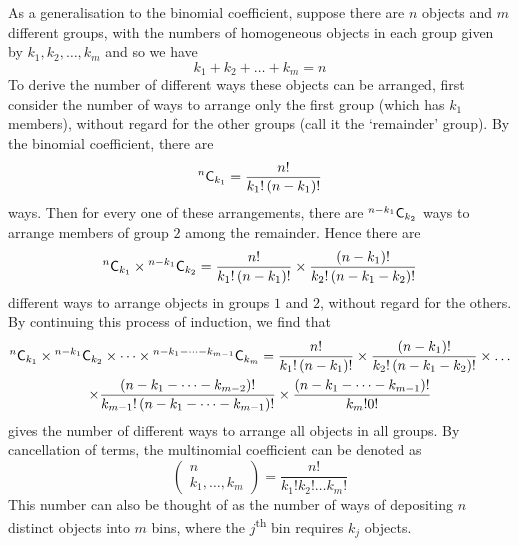 \documentclass[11pt]{report} %
\begin{document}
As a generalisation to the binomial coefficient, suppose there are $n$ objects and $m$ different groups, with the numbers of homogeneous objects in each group given by $k_{1}, k_{2}, \dots, k_{m}$ and so we have
\begin{equation}
k_{1} + k_{2} + \dots + k_{m} = n
\end{equation}
To derive the number of different ways these objects can be arranged, first consider the number of ways to arrange only the first group (which has $k_{1}$ members), without regard for the other groups (call it the `remainder' group). By the binomial coefficient, there are
\begin{equation}
\mathstrut^{n}\mathsf{C}_{k_{1}} = \dfrac{n!}{k_{1}!\left(n - k_{1}\right)!}
\end{equation}
ways. Then for every one of these arrangements, there are $\mathstrut^{n - k_{1}}\mathsf{C}_{k_{2}}$ ways to arrange members of group $2$ among the remainder. Hence there are
\begin{equation}
\mathstrut^{n}\mathsf{C}_{k_{1}}\times\mathstrut^{n - k_{1}}\mathsf{C}_{k_{2}} = \dfrac{n!}{k_{1}!\left(n - k_{1}\right)!}\times\dfrac{\left(n - k_{1}\right)!}{k_{2}!\left(n - k_{1} - k_{2}\right)!}
\end{equation}
different ways to arrange objects in groups $1$ and $2$, without regard for the others. By continuing this process of induction, we find that
\begin{multline}
\mathstrut^{n}\mathsf{C}_{k_{1}}\times\mathstrut^{n - k_{1}}\mathsf{C}_{k_{2}}\times\dots\times\mathstrut^{n - k_{1} - \dots - k_{m - 1}}\mathsf{C}_{k_{m}} = \dfrac{n!}{k_{1}!\left(n - k_{1}\right)!}\times\dfrac{\left(n - k_{1}\right)!}{k_{2}!\left(n - k_{1} - k_{2}\right)!}\times\dots \\
\times \dfrac{\left(n - k_{1} - \dots - k_{m - 2}\right)!}{k_{m - 1}!\left(n - k_{1} - \dots - k_{m - 1}\right)!}\times\dfrac{\left(n - k_{1} - \dots - k_{m - 1}\right)!}{k_{m}!0!}
\end{multline}
gives the number of different ways to arrange all objects in all groups. By cancellation of terms, the multinomial coefficient can be denoted as
\begin{equation}
\begin{pmatrix} n \\ k_{1}, \dots, k_{m}\end{pmatrix} = \dfrac{n!}{k_{1}!k_{2}!\dots k_{m}!}
\end{equation}
This number can also be thought of as the number of ways of depositing $n$ distinct objects into $m$ bins, where the $j$\textsuperscript{th} bin requires $k_{j}$ objects.
\end{document}

